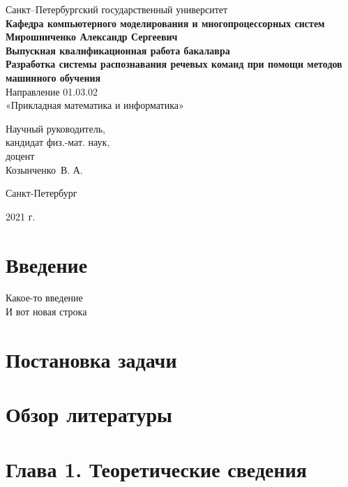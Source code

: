 \documentclass[14pt]{article}
\begin{document}
\begin{titlepage}
\begin{center}
Санкт--Петербургский государственный университет \\
\textbf{Кафедра компьютерного моделирования и многопроцессорных систем}
\vspace{55mm} \\
\textbf{\large Мирошниченко Александр Сергеевич} \\[10mm]
\textbf{\large Выпускная квалификационная работа бакалавра} \\[10mm]
\textbf{\large Разработка системы распознавания речевых команд при помощи методов машинного обучения} \\
Направление 01.03.02 \\
«Прикладная математика и информатика»\\[30mm]
\begin{flushright}
{Научный руководитель,} \\
кандидат физ.-мат. наук, \\доцент \\Козынченко~В. А. 
\end{flushright}
\vfill 
{Санкт-Петербург}
\par{2021 г.}
\end{center}
\end{titlepage}
\addtocounter{page}{1}

\tableofcontents
\newpage

\section*{Введение}
Какое-то введение \\
И вот новая строка

\section*{Постановка задачи}

\section*{Обзор литературы}

\section*{Глава 1. Теоретические сведения}
\end{document}
